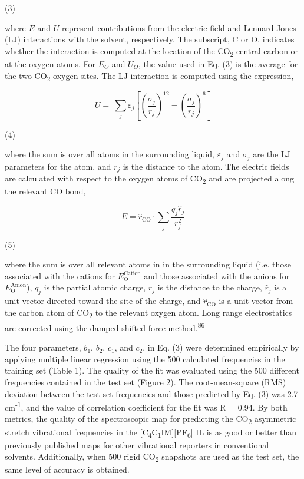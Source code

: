 \documentclass[]{article}
\begin{document}
(3)

where \(E\) and \(U\) represent contributions from the electric field
and Lennard-Jones (LJ) interactions with the solvent, respectively. The
subscript, C or O, indicates whether the interaction is computed at the
location of the CO\textsubscript{2} central carbon or at the oxygen
atoms. For \(E_{O}\) and \(U_{O}\), the value used in Eq. (3) is the
average for the two CO\textsubscript{2} oxygen sites. The LJ interaction
is computed using the expression,

\[U = \ \sum_{j}^{}\varepsilon_{j}\left\lbrack \left( \frac{\sigma_{j}}{r_{j}} \right)^{12} - \left( \frac{\sigma_{j}}{r_{j}} \right)^{6} \right\rbrack\]

(4)

where the sum is over all atoms in the surrounding liquid,
\(\varepsilon_{j}\) and \(\sigma_{j}\) are the LJ parameters for the
atom, and \(r_{j}\) is the distance to the atom. The electric fields are
calculated with respect to the oxygen atoms of CO\textsubscript{2} and
are projected along the relevant CO bond,

\[E = {\widehat{r}}_{\mathrm{\text{CO}}} \cdot \sum_{j}^{}\frac{q_{j}{\widehat{r}}_{j}}{r_{j}^{2}}\]

(5)

where the sum is over all relevant atoms in in the surrounding liquid
(i.e. those associated with the cations for
\(E_{\mathrm{O}}^{\text{Cation}}\) and those associated with the anions
for \(E_{\mathrm{O}}^{\text{Anion}}\)), \(q_{j}\) is the partial atomic
charge, \(r_{j}\) is the distance to the charge, \({\widehat{r}}_{j}\)
is a unit-vector directed toward the site of the charge, and
\({\widehat{r}}_{\mathrm{\text{CO}}}\) is a unit vector from the carbon
atom of CO\textsubscript{2} to the relevant oxygen atom. Long range
electrostatics are corrected using the damped shifted force
method.\textsuperscript{86}

The four parameters, \(b_{1}\), \(b_{2}\), \(c_{1}\), and \(c_{2}\), in
Eq. (3) were determined empirically by applying multiple linear
regression using the 500 calculated frequencies in the training set
(Table 1). The quality of the fit was evaluated using the 500 different
frequencies contained in the test set (Figure 2). The root-mean-square
(RMS) deviation between the test set frequencies and those predicted by
Eq. (3) was 2.7 cm\textsuperscript{-1}, and the value of correlation
coefficient for the fit was R = 0.94. By both metrics, the quality of
the spectroscopic map for predicting the CO\textsubscript{2} asymmetric
stretch vibrational frequencies in the
{[}C\textsubscript{4}C\textsubscript{1}IM{]}{[}PF\textsubscript{6}{]} IL
is as good or better than previously published maps for other
vibrational reporters in conventional solvents. Additionally, when 500
rigid CO\textsubscript{2} snapshots are used as the test set, the same
level of accuracy is obtained.
\end{document}
